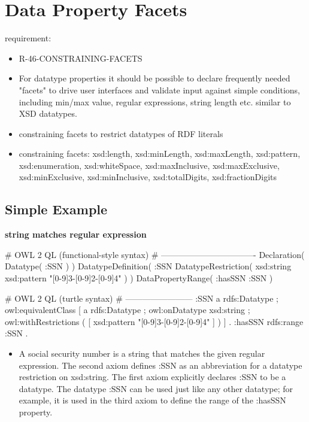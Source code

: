 \documentclass{llncs}
\begin{document}
\section{Data Property Facets}

requirement:

\begin{itemize}
	\item R-46-CONSTRAINING-FACETS
\end{itemize}



\begin{itemize}
  \item For datatype properties it should be possible to declare frequently needed "facets" to drive user interfaces and validate input against simple conditions, including min/max value, regular expressions, string length etc. similar to XSD datatypes. 
	\item constraining facets to restrict datatypes of RDF literals
  \item constraining facets: xsd:length, xsd:minLength, xsd:maxLength, xsd:pattern, xsd:enumeration, xsd:whiteSpace, xsd:maxInclusive, xsd:maxExclusive, xsd:minExclusive, xsd:minInclusive, xsd:totalDigits, xsd:fractionDigits

\end{itemize}

\subsection{Simple Example}

\textbf{string matches regular expression}

\begin{ex}
# OWL 2 QL (functional-style syntax)
# ----------------------------------
Declaration( Datatype( :SSN ) ) 
DatatypeDefinition( 
    :SSN
    DatatypeRestriction( xsd:string xsd:pattern "[0-9]{3}-[0-9]{2}-[0-9]{4}" ) )     
DataPropertyRange( :hasSSN :SSN ) 
\end{ex}

\begin{ex}
# OWL 2 QL (turtle syntax)
# ------------------------
:SSN 
    a rdfs:Datatype ;
    owl:equivalentClass [
        a rdfs:Datatype ;
        owl:onDatatype xsd:string ;
        owl:withRestrictions ( 
            [ xsd:pattern "[0-9]{3}-[0-9]{2}-[0-9]{4}" ] ) ] .
:hasSSN rdfs:range :SSN .
\end{ex}

\begin{itemize}
	\item A social security number is a string that matches the given regular expression. 
The second axiom defines :SSN as an abbreviation for a datatype restriction on xsd:string. 
The first axiom explicitly declares :SSN to be a datatype. 
The datatype :SSN can be used just like any other datatype; 
for example, it is used in the third axiom to define the range of the :hasSSN property. 
\end{itemize}
\end{document}
